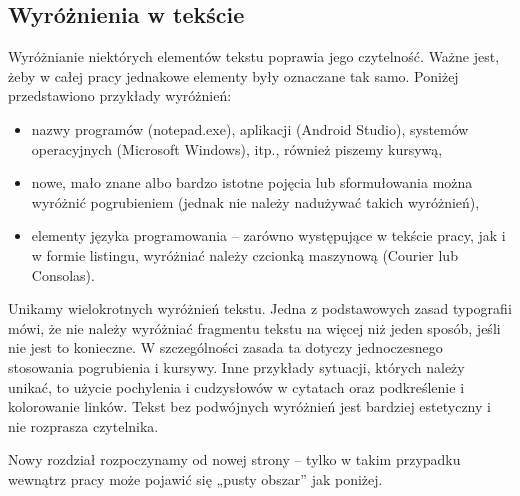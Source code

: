\subsection{Wyróżnienia w tekście}

Wyróżnianie niektórych elementów tekstu poprawia jego czytelność. Ważne jest, żeby w całej pracy jednakowe elementy były oznaczane tak samo. Poniżej przedstawiono przykłady wyróżnień:

\begin{itemize}
  \item nazwy programów (notepad.exe), aplikacji (Android Studio), systemów operacyjnych (Microsoft Windows), itp., również piszemy kursywą,
  \item nowe, mało znane albo bardzo istotne pojęcia lub sformułowania można wyróżnić pogrubieniem (jednak nie należy nadużywać takich wyróżnień),
  \item elementy języka programowania – zarówno występujące w tekście pracy, jak i w formie listingu, wyróżniać należy czcionką maszynową (Courier lub Consolas).
\end{itemize}

Unikamy wielokrotnych wyróżnień tekstu. Jedna z podstawowych zasad typografii mówi, że nie należy wyróżniać fragmentu tekstu na więcej niż jeden sposób, jeśli nie jest to konieczne. W szczególności zasada ta dotyczy jednoczesnego stosowania pogrubienia i kursywy. Inne przykłady sytuacji, których należy unikać, to użycie pochylenia i cudzysłowów w cytatach oraz podkreślenie i kolorowanie linków. Tekst bez podwójnych wyróżnień jest bardziej estetyczny i nie rozprasza czytelnika.

Nowy rozdział rozpoczynamy od nowej strony – tylko w takim przypadku wewnątrz pracy może pojawić się „pusty obszar” jak poniżej.
